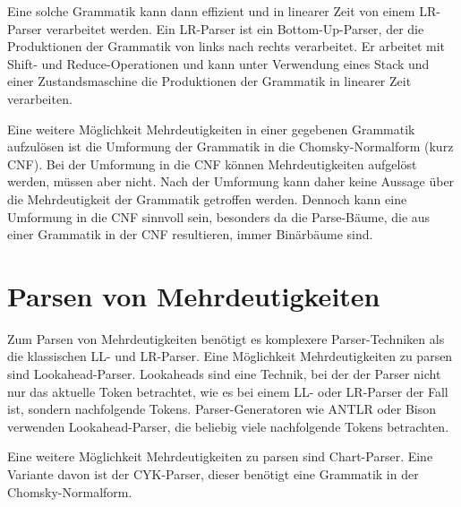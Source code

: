 \documentclass[runningheads]{llncs}
\begin{document}
	Eine solche Grammatik kann dann effizient und in linearer Zeit von einem LR-Parser verarbeitet werden.
	Ein LR-Parser ist ein Bottom-Up-Parser, der die Produktionen der Grammatik von links nach rechts verarbeitet.
	Er arbeitet mit Shift- und Reduce-Operationen und kann unter Verwendung eines Stack und einer Zustandsmaschine
	die Produktionen der Grammatik in linearer Zeit verarbeiten.

	Eine weitere Möglichkeit Mehrdeutigkeiten in einer gegebenen Grammatik aufzulösen
	ist die Umformung der Grammatik in die Chomsky-Normalform (kurz CNF).
	Bei der Umformung in die CNF können Mehrdeutigkeiten aufgelöst werden, müssen aber nicht.
	Nach der Umformung kann daher keine Aussage über die Mehrdeutigkeit der Grammatik getroffen werden.
	Dennoch kann eine Umformung in die CNF sinnvoll sein, besonders da die Parse-Bäume,
	die aus einer Grammatik in der CNF resultieren, immer Binärbäume sind.



	\section{Parsen von Mehrdeutigkeiten}\label{sec:parsen-von-mehrdeutigkeiten}

	Zum Parsen von Mehrdeutigkeiten benötigt es komplexere Parser-Techniken als die klassischen LL- und LR-Parser.
	Eine Möglichkeit Mehrdeutigkeiten zu parsen sind Lookahead-Parser.
	Lookaheads sind eine Technik, bei der der Parser nicht nur das aktuelle Token betrachtet,
	wie es bei einem LL- oder LR-Parser der Fall ist, sondern nachfolgende Tokens.
	Parser-Generatoren wie ANTLR oder Bison verwenden Lookahead-Parser,
	die beliebig viele nachfolgende Tokens betrachten.

	Eine weitere Möglichkeit Mehrdeutigkeiten zu parsen sind Chart-Parser.
	Eine Variante davon ist der CYK-Parser,
	dieser benötigt eine Grammatik in der Chomsky-Normalform.
\end{document}
